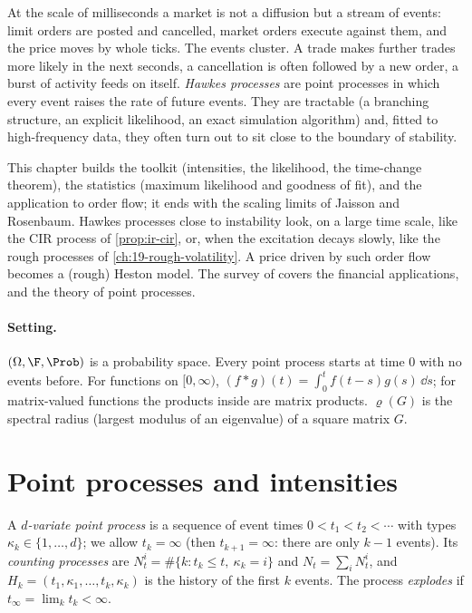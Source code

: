 
At the scale of milliseconds a market is not a diffusion but a stream of events: limit orders are
posted and cancelled, market orders execute against them, and the price moves by whole ticks. The
events cluster. A trade makes further trades more likely in the next seconds, a cancellation is
often followed by a new order, a burst of activity feeds on itself. \emph{Hawkes processes} are point
processes in which every event raises the rate of future events. They are tractable (a branching
structure, an explicit likelihood, an exact simulation algorithm) and, fitted to high-frequency data,
they often turn out to sit close to the boundary of stability.

This chapter builds the toolkit (intensities, the likelihood, the time-change theorem), the
statistics (maximum likelihood and goodness of fit), and the application to order flow; it ends with
the scaling limits of Jaisson and Rosenbaum. Hawkes processes close to instability look, on a large
time scale, like the CIR process of \cref{prop:ir-cir}, or, when the excitation decays slowly, like
the rough processes of \cref{ch:19-rough-volatility}. A price driven by such order flow becomes a
(rough) Heston model. The survey of \textcite{bacry-mastromatteo-muzy-2015} covers the financial
applications, and \textcite{daley-vere-jones-2003} the theory of point processes.

\paragraph{Setting.} $(\Omega,\F,\Prob)$ is a probability space. Every point process starts at time
$0$ with no events before. For functions on $[0,\infty)$, $(f*g)(t)=\int_0^tf(t-s)g(s)\,\dd s$; for
matrix-valued functions the products inside are matrix products. $\varrho(G)$ is the spectral radius
(largest modulus of an eigenvalue) of a square matrix $G$.

\section{Point processes and intensities}\label{sec:hk-intensity}

A \emph{$d$-variate point process} is a sequence of event times $0<t_1<t_2<\cdots$ with types
$\kappa_k\in\{1,\dots,d\}$; we allow $t_k=\infty$ (then $t_{k+1}=\infty$: there are only $k-1$
events). Its \emph{counting processes} are $N^i_t=\#\{k:t_k\le t,\ \kappa_k=i\}$ and
$N_t=\sum_iN^i_t$, and $H_k=(t_1,\kappa_1,\dots,t_k,\kappa_k)$ is the history of the first $k$ events.
The process \emph{explodes} if $t_\infty=\lim_kt_k<\infty$.

